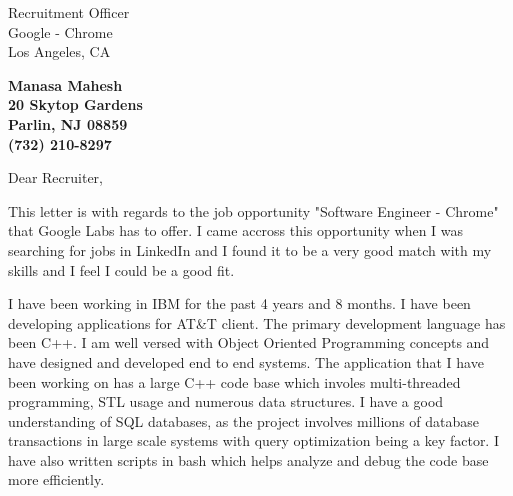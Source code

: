 \documentclass[11pt]{letter} %
\begin{document}

\begin{letter}{
Recruitment Officer \\
Google - Chrome\\
Los Angeles, CA } 


\begin{center}
\large\bf Manasa Mahesh \\ %
20 Skytop Gardens \\ Parlin, NJ 08859 \\ (732) 210-8297 %
\end{center} 
\vfill

\signature{Manasa Mahesh} %


\opening{Dear Recruiter,} 
 
 This letter is with regards to the job opportunity "Software Engineer - Chrome"
 that Google Labs has to offer. I came accross this
 opportunity when I was searching for jobs in LinkedIn and I found it 
 to be a very good match with my skills and I feel I could be a
 good fit. 

 I have been working in IBM for the past 4 years and 8 months. I have been
 developing applications for AT\&T client. The primary development language has been C++. I am well
 versed with Object Oriented Programming concepts and have designed and
 developed end to end systems. The application that I have been working on has a large
 C++ code base which involes multi-threaded programming, STL usage and numerous
 data structures. I have a good understanding of SQL databases, as the project
 involves millions of database transactions in large scale systems with query
 optimization being a key factor. I have also written scripts in bash which helps analyze and debug the code
 base more efficiently. 
 

\end{letter}
\end{document}
